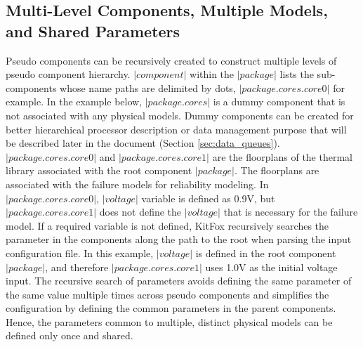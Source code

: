 \subsection{Multi-Level Components, Multiple Models, and Shared Parameters} \label{subsec:multilevel_components}
\noindent
Pseudo components can be recursively created to construct multiple levels of pseudo component hierarchy. 
$|component|$ within the $|package|$ lists the sub-components whose name paths are delimited by dots, $|package.cores.core0|$ for example.
In the example below, $|package.cores|$ is a dummy component that is not associated with any physical models.
Dummy components can be created for better hierarchical processor description or data management purpose that will be described later in the document (Section \ref{sec:data_queues}).
$|package.cores.core0|$ and $|package.cores.core1|$ are the floorplans of the thermal library associated with the root component $|package|$.
The floorplans are associated with the failure models for reliability modeling.
In $|package.cores.core0|$, $|voltage|$ variable is defined as 0.9V, but $|package.cores.core1|$ does not define the $|voltage|$ that is necessary for the failure model.
If a required variable is not defined, KitFox recursively searches the parameter in the components along the path to the root when parsing the input configuration file.
In this example, $|voltage|$ is defined in the root component $|package|$, and therefore $|package.cores.core1|$ uses 1.0V as the initial voltage input.
The recursive search of parameters avoids defining the same parameter of the same value multiple times across pseudo components and simplifies the configuration by defining the common parameters in the parent components. 
Hence, the parameters common to multiple, distinct physical models can be defined only once and shared.


